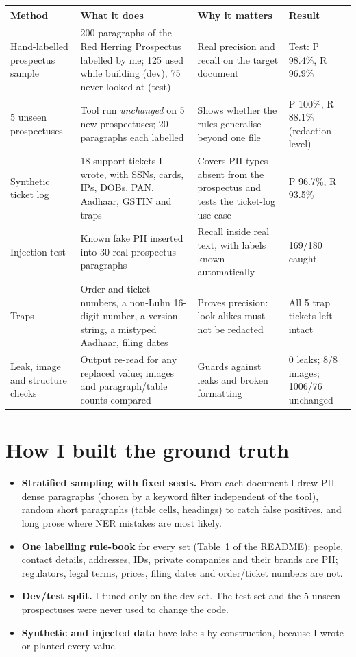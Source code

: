\documentclass[11pt,a4paper]{article}
\begin{document}
\begin{tabularx}{\textwidth}{@{}P{2.6cm}LLP{2.7cm}@{}}
\toprule
\textbf{Method} & \textbf{What it does} & \textbf{Why it matters} & \textbf{Result} \\
\midrule
Hand-labelled prospectus sample & 200 paragraphs of the Red Herring Prospectus labelled by me; 125 used while building (dev), 75 never looked at (test) & Real precision and recall on the target document & Test: P 98.4\%, R 96.9\% \\
5 unseen prospectuses & Tool run \emph{unchanged} on 5 new prospectuses; 20 paragraphs each labelled & Shows whether the rules generalise beyond one file & P 100\%, R 88.1\% (redaction-level) \\
Synthetic ticket log & 18 support tickets I wrote, with SSNs, cards, IPs, DOBs, PAN, Aadhaar, GSTIN and traps & Covers PII types absent from the prospectus and tests the ticket-log use case & P 96.7\%, R 93.5\% \\
Injection test & Known fake PII inserted into 30 real prospectus paragraphs & Recall inside real text, with labels known automatically & 169/180 caught \\
Traps & Order and ticket numbers, a non-Luhn 16-digit number, a version string, a mistyped Aadhaar, filing dates & Proves precision: look-alikes must not be redacted & All 5 trap tickets left intact \\
Leak, image and structure checks & Output re-read for any replaced value; images and paragraph/table counts compared & Guards against leaks and broken formatting & 0 leaks; 8/8 images; 1006/76 unchanged \\
\bottomrule
\end{tabularx}

\section{How I built the ground truth}
\begin{itemize}
\item \textbf{Stratified sampling with fixed seeds.} From each document I drew PII-dense paragraphs (chosen by a keyword filter independent of the tool), random short paragraphs (table cells, headings) to catch false positives, and long prose where NER mistakes are most likely.
\item \textbf{One labelling rule-book} for every set (Table~1 of the README): people, contact details, addresses, IDs, private companies and their brands are PII; regulators, legal terms, prices, filing dates and order/ticket numbers are not.
\item \textbf{Dev/test split.} I tuned only on the dev set. The test set and the 5 unseen prospectuses were never used to change the code.
\item \textbf{Synthetic and injected data} have labels by construction, because I wrote or planted every value.
\end{itemize}
\end{document}
